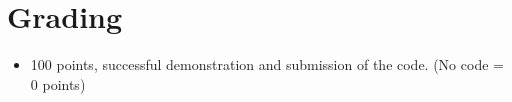 \section{Grading}
\begin{itemize}
\item 100 points, successful demonstration and submission of the code. (No code = 0 points)
\end{itemize}


